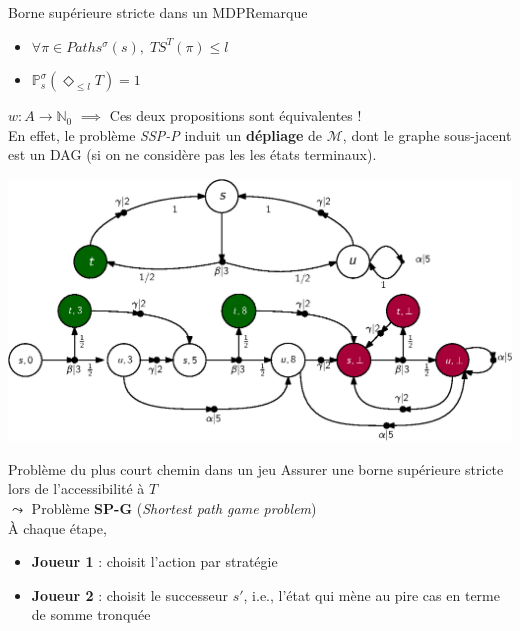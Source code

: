 \documentclass[compress]{beamer}
\theoremstyle{theorem}%
\begin{document}
\begin{frame}{Borne supérieure stricte dans un MDP}{Remarque}
  \begin{itemize}
    \item $\forall \pi \in Paths^\sigma(s), \; TS^T(\pi) \leq l$
    \item $\mathbb{P}_s^\sigma (\Diamond_{\leq l} T ) = 1$ \\
  \end{itemize}
  {\small {\color{fibeamer@orange}$w:A \rightarrow \mathbb{N}_0$} $\implies$ Ces deux propositions sont équivalentes ! \\
  En effet, le problème \textit{SSP-P} induit un \textbf{\color{fibeamer@orange}dépliage} de $\mathcal{M}$, dont le graphe sous-jacent est un DAG (si on ne considère pas les les états terminaux).}
  \begin{center}
    \includegraphics[width=0.7\linewidth]{resources/unfolding}
  \end{center}
\end{frame}

\begin{frame}{Problème du plus court chemin dans un jeu}
    Assurer une borne supérieure stricte lors de l'accessibilité à $T$  \\ {\color{fibeamer@blue}$\leadsto$} Problème \textbf{\color{fibeamer@orange}SP-G} (\textit{Shortest path game problem}) \\
    \`A chaque étape,
    \begin{itemize}
      \item \textbf{Joueur 1} : choisit l'action par stratégie
      \item \textbf{Joueur 2} : choisit le successeur $s'$, i.e., l'état qui mène au pire cas en terme de somme tronquée
    \end{itemize}
\end{frame}
\end{document}

